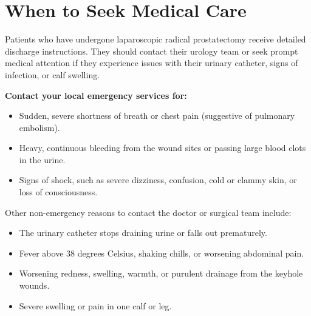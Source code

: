 \section*{When to Seek Medical Care}
Patients who have undergone laparoscopic radical prostatectomy receive detailed discharge instructions. They should contact their urology team or seek prompt medical attention if they experience issues with their urinary catheter, signs of infection, or calf swelling.

\textbf{Contact your local emergency services for:}
\begin{itemize}
    \item Sudden, severe shortness of breath or chest pain (suggestive of pulmonary embolism).
    \item Heavy, continuous bleeding from the wound sites or passing large blood clots in the urine.
    \item Signs of shock, such as severe dizziness, confusion, cold or clammy skin, or loss of consciousness.
\end{itemize}

Other non-emergency reasons to contact the doctor or surgical team include:
\begin{itemize}
    \item The urinary catheter stops draining urine or falls out prematurely.
    \item Fever above 38 degrees Celsius, shaking chills, or worsening abdominal pain.
    \item Worsening redness, swelling, warmth, or purulent drainage from the keyhole wounds.
    \item Severe swelling or pain in one calf or leg.
\end{itemize}

